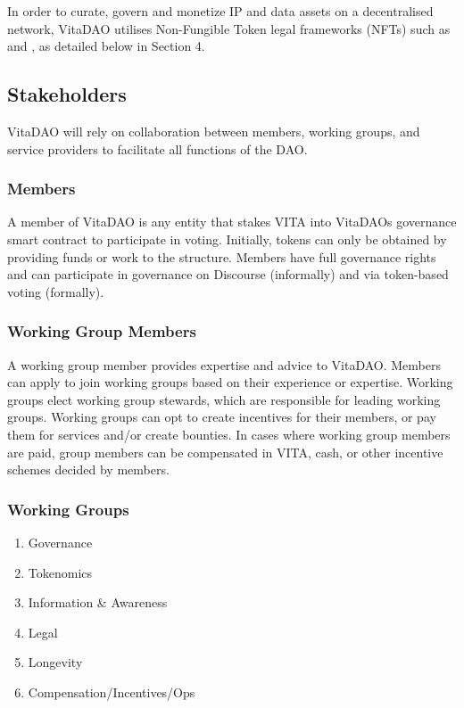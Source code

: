 \documentclass[12pt,letterpaper]{article}
\begin{document}
In order to curate, govern and monetize IP and data assets on a decentralised network, VitaDAO utilises Non-Fungible Token legal frameworks (NFTs) such as  and , as detailed below in Section 4.

\subsection{Stakeholders}
VitaDAO will rely on collaboration between members, working groups, and service providers to facilitate all functions of the DAO.  

\subsubsection{Members}
A member of VitaDAO is any entity that stakes VITA into VitaDAOs governance smart contract to participate in voting. Initially, tokens can only be obtained by providing funds or work to the structure. Members have full governance rights and can participate in governance on Discourse (informally) and via token-based voting (formally).

\subsubsection{Working Group Members}
A working group member provides expertise and advice to VitaDAO. Members can apply to join working groups based on their experience or expertise. Working groups elect working group stewards, which are responsible for leading working groups. Working groups can opt to create incentives for their members, or pay them for services and/or create bounties. In cases where working group members are paid, group members can be compensated in VITA, cash, or other incentive schemes decided by members.

\subsubsection{Working Groups}
\begin{enumerate}
\item Governance
\item Tokenomics
\item Information \& Awareness
\item Legal
\item Longevity
\item Compensation/Incentives/Ops
\end{enumerate}
\end{document}
